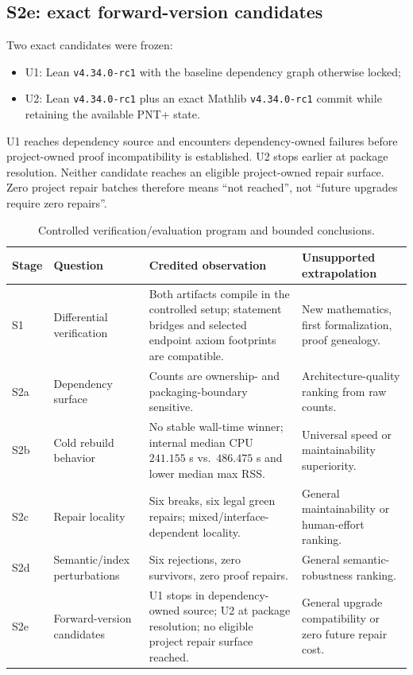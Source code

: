 \documentclass[sigplan,10pt,anonymous,review]{acmart}
\newcommand{\code}[1]{\texttt{#1}}
\begin{document}
\subsection{S2e: exact forward-version candidates}
Two exact candidates were frozen:
\begin{itemize}
\item U1: Lean \code{v4.34.0-rc1} with the baseline dependency graph otherwise locked;
\item U2: Lean \code{v4.34.0-rc1} plus an exact Mathlib \code{v4.34.0-rc1} commit while retaining the available PNT+ state.
\end{itemize}
U1 reaches dependency source and encounters dependency-owned failures before project-owned proof incompatibility is established. U2 stops earlier at package resolution. Neither candidate reaches an eligible project-owned repair surface. Zero project repair batches therefore means ``not reached'', not ``future upgrades require zero repairs''.

\begin{table}[t]
\small
\caption{Controlled verification/evaluation program and bounded conclusions.}
\label{tab:summary}
\begin{tabular}{@{}p{}p{}p{}p{}@{}}
\toprule
Stage & Question & Credited observation & Unsupported extrapolation\\
\midrule
S1 & Differential verification & Both artifacts compile in the controlled setup; statement bridges and selected endpoint axiom footprints are compatible. & New mathematics, first formalization, proof genealogy.\\
S2a & Dependency surface & Counts are ownership- and packaging-boundary sensitive. & Architecture-quality ranking from raw counts.\\
S2b & Cold rebuild behavior & No stable wall-time winner; internal median CPU $241.155$ s vs.\ $486.475$ s and lower median max RSS. & Universal speed or maintainability superiority.\\
S2c & Repair locality & Six breaks, six legal green repairs; mixed/interface-dependent locality. & General maintainability or human-effort ranking.\\
S2d & Semantic/index perturbations & Six rejections, zero survivors, zero proof repairs. & General semantic-robustness ranking.\\
S2e & Forward-version candidates & U1 stops in dependency-owned source; U2 at package resolution; no eligible project repair surface reached. & General upgrade compatibility or zero future repair cost.\\
\bottomrule
\end{tabular}
\end{table}
\end{document}
